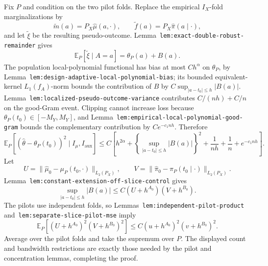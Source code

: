 Fix \(P\) and condition on the two pilot folds. Replace the empirical \(I_X\)-fold marginalizations by
\[
\widetilde m(a)=P_X\widehat\mu(a,\cdot),
\qquad
\widetilde f(a)=P_X\widehat\pi(a\mid\cdot),
\]
and let \(\widetilde\xi\) be the resulting pseudo-outcome. Lemma~\texttt{lem:exact-double-robust-remainder} gives
\[
\mathbb E_P[\widetilde\xi\mid A=a]=\theta_P(a)+B(a).
\]
The population local-polynomial functional has bias at most \(Ch^\alpha\) on \(\theta_P\), by Lemma~\texttt{lem:design-adaptive-local-polynomial-bias}; its bounded equivalent-kernel \(L_1(f_A)\)-norm bounds the contribution of \(B\) by \(C\sup_{|a-t_0|\le h}|B(a)|\). Lemma~\texttt{lem:localized-pseudo-outcome-variance} contributes \(C/(nh)+C/n\) on the good-Gram event. Clipping cannot increase loss because \(\theta_P(t_0)\in[-M_Y,M_Y]\), and Lemma~\texttt{lem:empirical-local-polynomial-good-gram} bounds the complementary contribution by \(Ce^{-c_1nh}\). Therefore
\[
\mathbb E_P[(\widehat\theta-\theta_P(t_0))^2\mid I_\mu,I_{\mathrm{aux}}]
\le C\left[h^{2\alpha}+\left\{\sup_{|a-t_0|\le h}|B(a)|\right\}^2+\frac1{nh}+\frac1n+e^{-c_1nh}\right].
\]
Let
\[
U=\|\widehat\mu_0-\mu_P(t_0,\cdot)\|_{L_2(P_X)},
\qquad
V=\|\widehat\pi_0-\pi_P(t_0\mid\cdot)\|_{L_2(P_X)}.
\]
Lemma~\texttt{lem:constant-extension-off-slice-control} gives
\[
\sup_{|a-t_0|\le h}|B(a)|
\le C(U+h^{A_0})(V+h^{B_0}).
\]
The pilots use independent folds, so Lemmas~\texttt{lem:independent-pilot-product} and~\texttt{lem:separate-slice-pilot-mse} imply
\[
\mathbb E_P[(U+h^{A_0})^2(V+h^{B_0})^2]
\le C(u+h^{A_0})^2(v+h^{B_0})^2.
\]
Average over the pilot folds and take the supremum over \(P\). The displayed count and bandwidth restrictions are exactly those needed by the pilot and concentration lemmas, completing the proof.